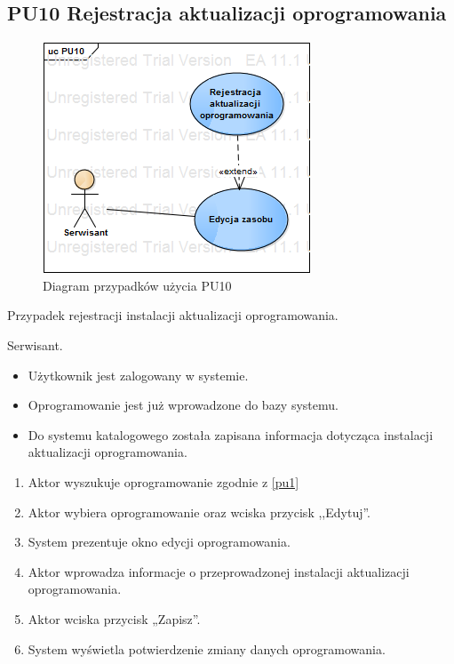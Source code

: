 \subsection{PU10 Rejestracja aktualizacji oprogramowania} \label{pu10}
\begin{figure}[h!]
	\centering
	\includegraphics[scale=0.6]{img/diagrams/useCaseDiagrams/PU10}
	\caption{Diagram przypadków użycia PU10 \label{fig:labelUCPU10}}
\end{figure}

Przypadek rejestracji instalacji aktualizacji oprogramowania.

Serwisant.

\begin{itemize}
\item Użytkownik jest zalogowany w systemie.
\item Oprogramowanie jest już wprowadzone do bazy systemu.
\end{itemize}

\begin{itemize}
\item Do systemu katalogowego została zapisana informacja dotycząca instalacji aktualizacji oprogramowania.
\end{itemize}

\begin{enumerate}
	\item \label{pu10:1} Aktor wyszukuje oprogramowanie zgodnie z \ref{pu1}
	\item \label{pu10:2} Aktor wybiera oprogramowanie oraz wciska przycisk ,,Edytuj''.
	\item System prezentuje okno edycji oprogramowania.
	\item \label{pu10:4} Aktor wprowadza informacje o przeprowadzonej instalacji aktualizacji oprogramowania.
	\item Aktor wciska przycisk „Zapisz”.
	\item System wyświetla potwierdzenie zmiany danych oprogramowania.
\end{enumerate}

